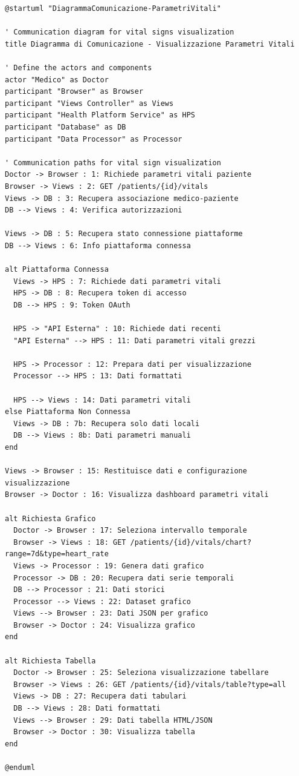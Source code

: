 \documentclass[12pt,a4paper,oneside]{report}
\begin{document}
\begin{lstlisting}[basicstyle=\small\ttfamily, breaklines=true, caption={visualizzazione dei parametri vitali}]
@startuml "DiagrammaComunicazione-ParametriVitali"

' Communication diagram for vital signs visualization
title Diagramma di Comunicazione - Visualizzazione Parametri Vitali

' Define the actors and components
actor "Medico" as Doctor
participant "Browser" as Browser
participant "Views Controller" as Views
participant "Health Platform Service" as HPS
participant "Database" as DB
participant "Data Processor" as Processor

' Communication paths for vital sign visualization
Doctor -> Browser : 1: Richiede parametri vitali paziente
Browser -> Views : 2: GET /patients/{id}/vitals
Views -> DB : 3: Recupera associazione medico-paziente
DB --> Views : 4: Verifica autorizzazioni

Views -> DB : 5: Recupera stato connessione piattaforme
DB --> Views : 6: Info piattaforma connessa

alt Piattaforma Connessa
  Views -> HPS : 7: Richiede dati parametri vitali
  HPS -> DB : 8: Recupera token di accesso
  DB --> HPS : 9: Token OAuth
  
  HPS -> "API Esterna" : 10: Richiede dati recenti
  "API Esterna" --> HPS : 11: Dati parametri vitali grezzi
  
  HPS -> Processor : 12: Prepara dati per visualizzazione
  Processor --> HPS : 13: Dati formattati
  
  HPS --> Views : 14: Dati parametri vitali
else Piattaforma Non Connessa
  Views -> DB : 7b: Recupera solo dati locali
  DB --> Views : 8b: Dati parametri manuali
end

Views -> Browser : 15: Restituisce dati e configurazione visualizzazione
Browser -> Doctor : 16: Visualizza dashboard parametri vitali

alt Richiesta Grafico
  Doctor -> Browser : 17: Seleziona intervallo temporale
  Browser -> Views : 18: GET /patients/{id}/vitals/chart?range=7d&type=heart_rate
  Views -> Processor : 19: Genera dati grafico
  Processor -> DB : 20: Recupera dati serie temporali
  DB --> Processor : 21: Dati storici
  Processor --> Views : 22: Dataset grafico
  Views --> Browser : 23: Dati JSON per grafico
  Browser -> Doctor : 24: Visualizza grafico
end

alt Richiesta Tabella
  Doctor -> Browser : 25: Seleziona visualizzazione tabellare
  Browser -> Views : 26: GET /patients/{id}/vitals/table?type=all
  Views -> DB : 27: Recupera dati tabulari
  DB --> Views : 28: Dati formattati
  Views --> Browser : 29: Dati tabella HTML/JSON
  Browser -> Doctor : 30: Visualizza tabella
end

@enduml

\end{lstlisting}
\end{document}
